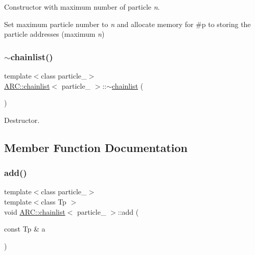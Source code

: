 Constructor with maximum number of particle {\itshape n}. 

Set maximum particle number to {\itshape n} and allocate memory for \#p to storing the particle addresses (maximum {\itshape n}) \hypertarget{classARC_1_1chainlist_ae4e636b2eb05e8e5665315e8215e2c6d}{}\label{classARC_1_1chainlist_ae4e636b2eb05e8e5665315e8215e2c6d} 
\subsubsection{\texorpdfstring{$\sim$chainlist()}{~chainlist()}}
{\footnotesize\ttfamily template$<$class particle\+\_\+$>$ \\
\hyperlink{classARC_1_1chainlist}{A\+R\+C\+::chainlist}$<$ particle\+\_\+ $>$\+::$\sim$\hyperlink{classARC_1_1chainlist}{chainlist} (\begin{DoxyParamCaption}{ }\end{DoxyParamCaption})\hspace{0.3cm}{\ttfamily [inline]}}



Destructor. 



\subsection{Member Function Documentation}
\hypertarget{classARC_1_1chainlist_a598c1819d8e715ec0a24669e5bb06c6a}{}\label{classARC_1_1chainlist_a598c1819d8e715ec0a24669e5bb06c6a} 
\subsubsection{\texorpdfstring{add()}{add()}\hspace{0.1cm}{\footnotesize\ttfamily [1/2]}}
{\footnotesize\ttfamily template$<$class particle\+\_\+$>$ \\
template$<$class Tp $>$ \\
void \hyperlink{classARC_1_1chainlist}{A\+R\+C\+::chainlist}$<$ particle\+\_\+ $>$\+::add (\begin{DoxyParamCaption}\item[{const Tp \&}]{a }\end{DoxyParamCaption})\hspace{0.3cm}{\ttfamily [inline]}}



